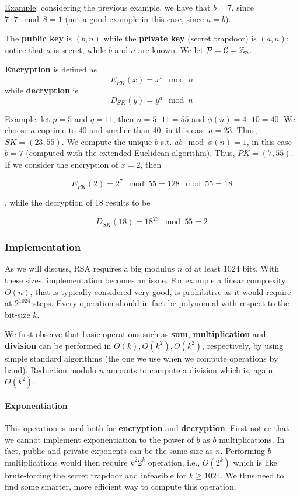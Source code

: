 \underline{Example}: considering the previous example, we have that $b = 7$, since $7 \cdot 7 \mod 8 = 1$ (not a good example in this case, since $a = b$).

The \textbf{public key} is $(b,n)$ while the \textbf{private key} (secret trapdoor) is $(a,n)$: notice that $a$ is secret, while $b$ and $n$ are known. We let ${\cal P}={\cal C} = \mathbb{Z}_n$. 

\textbf{Encryption} is defined as $$E_{PK}(x) = x^{b} \mod n$$ while \textbf{decryption} is $$D_{SK}(y) = y^{a} \mod n$$

\underline{Example}: let $p = 5$ and $q = 11$, then $n = 5 \cdot 11 = 55$ and $\phi(n) = 4 \cdot 10 = 40$. We choose $a$ coprime to 40 and smaller than 40, in this case $a = 23$. Thus, $SK = (23, 55)$. We compute the unique $b$ s.t. $ab \mod \phi(n) = 1$, in this case $b = 7$ (computed with the extended Euclidean algorithm). Thus, $PK = (7, 55)$. If we consider the encryption of $x = 2$, then

$$
E_{PK}(2) = 2^{7} \mod 55 = 128 \mod 55 = 18
$$

, while the decryption of 18 results to be

$$
D_{SK}(18) = 18^{23} \mod 55 = 2
$$


\subsubsection{Implementation}
As we will discuss, RSA requires a big modulus $n$ of at least 1024 bits. With these sizes, implementation becomes an issue. For example a linear complexity $O(n)$, that is typically considered very good, is prohibitive as it would require at $2^{1024}$ steps. Every operation should in fact be polynomial with respect to the bit-size $k$.

We first observe that basic operations such as \textbf{sum}, \textbf{multiplication} and \textbf{division} can be performed in $O(k), O(k^2), O(k^2)$, respectively, by using simple standard algorithms (the one we use when we compute operations by hand). Reduction modulo $n$ amounts to compute a division which is, again, $O(k^2)$.

\paragraph{Exponentiation}
This operation is used both for \textbf{encryption} and \textbf{decryption}. First notice that we cannot implement exponentiation to the power of $b$ as $b$ multiplications. In fact, public and private exponents can be the same size as $n$. Performing $b$ multiplications would then require $k^2 2^k$ operation, i.e., $O(2^k)$ which is like brute-forcing the secret trapdoor and infeasible for $k \geq 1024$. We thus need to find some smarter, more efficient way to compute this operation.

